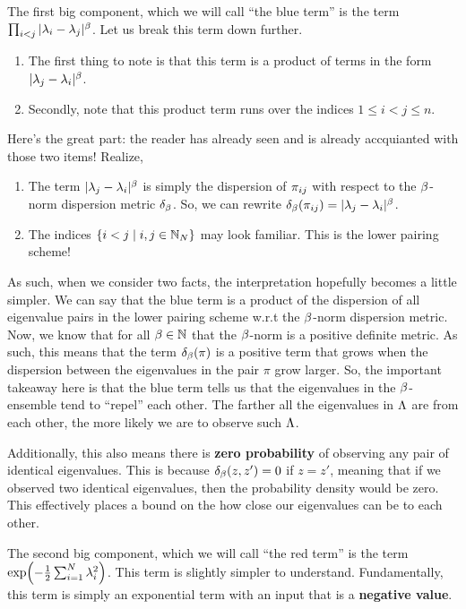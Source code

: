 \bigskip

 The first big component, which we will call ``the blue term'' is the term ${\prod_{i < j} |\lambda_i - \lambda_j|^{\beta}}$. Let us break this term down further.
  \begin{enumerate}
    \item The first thing to note is that this term is a product of terms in the form $|\lambda_j - \lambda_i|^\beta$.
    \item Secondly, note that this product term runs over the indices $1 \leq i < j \leq n$.
  \end{enumerate}
    Here's the great part: the reader has already seen and is already accquianted with those two items! Realize,
  \begin{enumerate}
    \item The term $|\lambda_j - \lambda_i|^\beta$ is simply the dispersion of ${\pi_{ij}}$ with respect to the $\beta$-norm dispersion metric $\delta_\beta$.
      So, we can rewrite $\delta_\beta({\pi_{ij}}) = |\lambda_j - \lambda_i|^\beta$.
    \item The indices $\{i < j \mid i,j \in \mathbb{N}_N\}$ may look familiar. This is the lower pairing scheme!
  \end{enumerate}
  As such, when we consider two facts, the interpretation hopefully becomes a little simpler. We can say that the blue term is a product of the dispersion of all eigenvalue pairs in the lower pairing scheme w.r.t the $\beta$-norm dispersion metric.
Now, we know that for all $\beta \in \mathbb{N}$ that the $\beta$-norm is a positive definite metric. As such, this means that the term $\delta_\beta(\pi)$ is a positive term that grows when the dispersion between the eigenvalues in the pair $\pi$ grow larger.
So, the important takeaway here is that the blue term tells us that the eigenvalues in the $\beta$-ensemble tend to ``repel'' each other.
The farther all the eigenvalues in $\Lambda$ are from each other, the more likely we are to observe such $\Lambda$.

Additionally, this also means there is \textbf{zero probability} of observing any pair of identical eigenvalues.
This is because $\delta_\beta(z,z') = 0$ if $z = z'$, meaning that if we observed two identical eigenvalues, then the probability density would be zero.
This effectively places a bound on the how close our eigenvalues can be to each other.

\bigskip

 The second big component, which we will call ``the red term'' is the term ${\exp({-\frac{1}{2} \sum_{i=1}^N \lambda_i^2})}$. This term is slightly simpler to understand.
Fundamentally, this term is simply an exponential term with an input that is a \textbf{negative value}.

